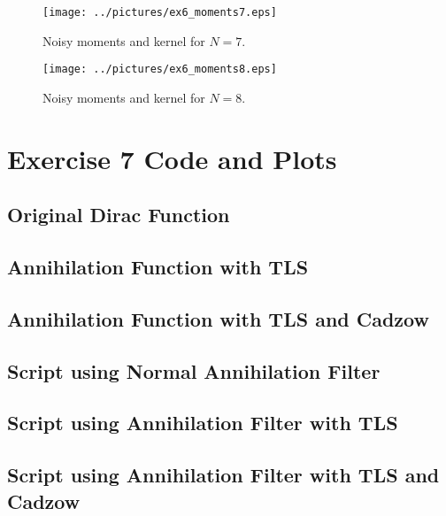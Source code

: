 \documentclass[11pt,a4paper]{report}
\begin{document}
\begin{figure}[!ht]
    \centering
    \texttt{[image: ../pictures/ex6\_moments7.eps]}
    \caption{Noisy moments and kernel for $N = 7$.}
\end{figure}

\begin{figure}[!ht]
    \centering
    \texttt{[image: ../pictures/ex6\_moments8.eps]}
    \caption{Noisy moments and kernel for $N = 8$.}
\end{figure}

\section{Exercise 7 Code and Plots}
\subsection{Original Dirac Function}

\newpage

\subsection{Annihilation Function with TLS}

\newpage

\subsection{Annihilation Function with TLS and Cadzow}

\newpage

\subsection{Script using Normal Annihilation Filter}

\newpage

\subsection{Script using Annihilation Filter with TLS}

\newpage

\subsection{Script using Annihilation Filter with TLS and Cadzow}

\newpage
\end{document}

